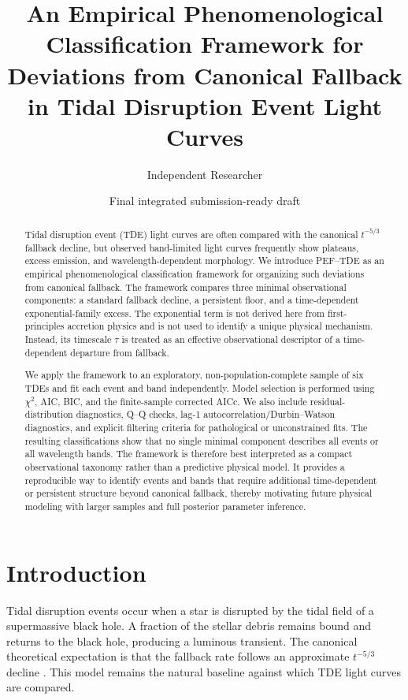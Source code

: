\documentclass[11pt]{article}
\title{An Empirical Phenomenological Classification Framework for Deviations from Canonical Fallback in Tidal Disruption Event Light Curves}
\author{Independent Researcher}
\date{Final integrated submission-ready draft}
\begin{document}
\maketitle

\begin{abstract}
Tidal disruption event (TDE) light curves are often compared with the canonical $t^{-5/3}$ fallback decline, but observed band-limited light curves frequently show plateaus, excess emission, and wavelength-dependent morphology. We introduce PEF--TDE as an empirical phenomenological classification framework for organizing such deviations from canonical fallback. The framework compares three minimal observational components: a standard fallback decline, a persistent floor, and a time-dependent exponential-family excess. The exponential term is not derived here from first-principles accretion physics and is not used to identify a unique physical mechanism. Instead, its timescale $\tau$ is treated as an effective observational descriptor of a time-dependent departure from fallback.

We apply the framework to an exploratory, non-population-complete sample of six TDEs and fit each event and band independently. Model selection is performed using $\chi^2$, AIC, BIC, and the finite-sample corrected AICc. We also include residual-distribution diagnostics, Q--Q checks, lag-1 autocorrelation/Durbin--Watson diagnostics, and explicit filtering criteria for pathological or unconstrained fits. The resulting classifications show that no single minimal component describes all events or all wavelength bands. The framework is therefore best interpreted as a compact observational taxonomy rather than a predictive physical model. It provides a reproducible way to identify events and bands that require additional time-dependent or persistent structure beyond canonical fallback, thereby motivating future physical modeling with larger samples and full posterior parameter inference.
\end{abstract}

\section{Introduction}
Tidal disruption events occur when a star is disrupted by the tidal field of a supermassive black hole. A fraction of the stellar debris remains bound and returns to the black hole, producing a luminous transient. The canonical theoretical expectation is that the fallback rate follows an approximate $t^{-5/3}$ decline \citep{rees1988,phinney1989}. This model remains the natural baseline against which TDE light curves are compared.
\end{document}
